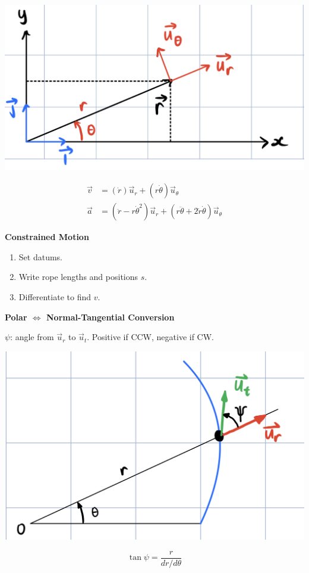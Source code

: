 \documentclass[10pt]{article}
\newcommand\heading[1]{\medskip\textbf{#1}\medskip}
\begin{document}
\begin{multicols*}{3}
\begin{center}
    \includegraphics[scale=0.15]{images/polar.jpg}
\end{center}
\begin{align*}
    \vec v&=(\dot r)\vec{u}_r+(r\dot{\theta})\vec{u}_\theta \\
    \vec a&=(\ddot{r}-r\dot{\theta}^2)\vec{u}_r+(r\ddot{\theta}+2\dot{r}\dot{\theta})\vec{u}_\theta
\end{align*}

\heading{Constrained Motion}

\begin{enumerate}[itemsep=0pt,topsep=0pt]
    \item Set datums.
    \item Write rope lengths and positions $s$.
    \item Differentiate to find $v$.
\end{enumerate}

\heading{Polar $\Leftrightarrow$ Normal-Tangential Conversion}

$\psi$: angle from $\vec u_r$ to $\vec u_t$. Positive if CCW, negative if CW.

\begin{center}
    \includegraphics[scale=0.1]{images/polar_nt_conversion.jpg}
\end{center}
\[\tan\psi=\frac{r}{dr/d\theta}\]


\end{multicols*}
\end{document}
